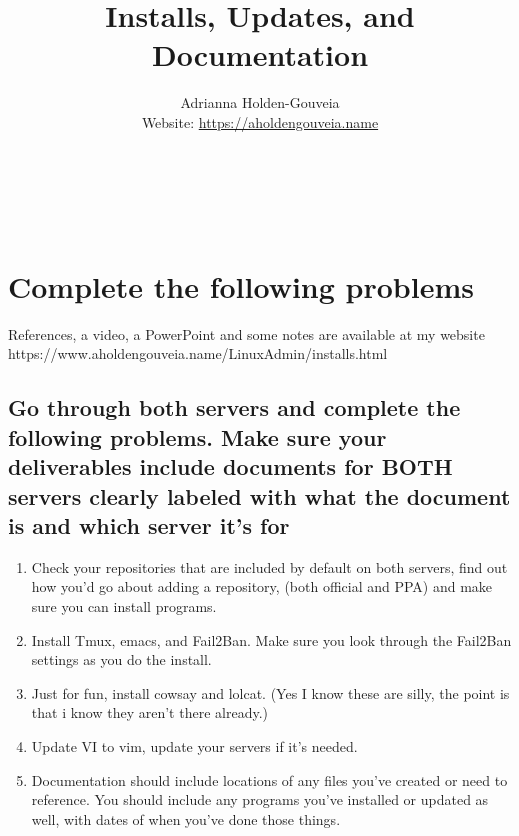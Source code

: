 \documentclass[12pt]{article}
\title{Installs, Updates, and Documentation}
\author{
        Adrianna Holden-Gouveia \\
        Website: \url{https://aholdengouveia.name}\\ 
        \date{\vspace{-5ex}}
        \faLinkedin{: aholdengouveia} \\
        \faGithub {: aholdengouveia} \\
        \faTwitter {: aholdengouveia} \\
        }
\begin{document}
    

\maketitle


\section*{Complete the following problems}

References, a video, a PowerPoint and some notes are available at my website
https://www.aholdengouveia.name/LinuxAdmin/installs.html



\subsection*{Go through both servers and complete the following problems.  Make sure your deliverables include documents for BOTH servers clearly labeled with what the document is and which server it's for}
    \begin{enumerate}
        \item Check your repositories that are included by default on both servers, find out how you'd go about adding a repository, (both official and PPA) and make sure you can install programs.
        \item Install Tmux, emacs, and Fail2Ban.  Make sure you look through the Fail2Ban settings as you do the install.
        \item Just for fun, install cowsay and lolcat.   (Yes I know these are silly, the point is that i know they aren't there already.)
        \item Update VI to vim, update your servers if it's needed.
        \item Documentation should include locations of any files you've created or need to reference. You should include any programs you've installed or updated as well, with dates of when you've done those things.
    \end{enumerate}
\end{document}

